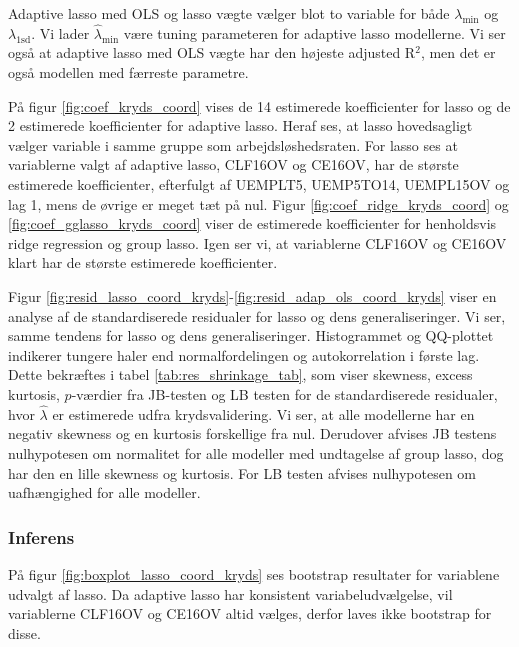 Adaptive lasso med OLS og lasso vægte vælger blot to variable for både  $\lambda_{\min}$ og $\lambda_{1\text{sd}}$. 
Vi lader $\widehat{\lambda}_{\min}$ være tuning parameteren for adaptive lasso modellerne. Vi ser også at adaptive lasso med OLS vægte har den højeste adjusted R$^2$, men det er også modellen med færreste parametre. 

På figur \ref{fig:coef_kryds_coord} vises de 14 estimerede koefficienter for lasso og de 2 estimerede koefficienter for adaptive lasso.
Heraf ses, at lasso hovedsagligt vælger variable i samme gruppe som arbejdsløshedsraten.
For lasso ses at variablerne valgt af adaptive lasso, \textcolor{blue3}{CLF16OV} og \textcolor{blue3}{CE16OV}, har de største estimerede koefficienter, efterfulgt af \textcolor{blue3}{UEMPLT5}, \textcolor{blue3}{UEMP5TO14}, \textcolor{blue3}{UEMPL15OV} og \textcolor{blue3}{lag 1}, mens de øvrige er meget tæt på nul. 
Figur \ref{fig:coef_ridge_kryds_coord} og \ref{fig:coef_gglasso_kryds_coord} viser de estimerede koefficienter for henholdsvis ridge regression og group lasso.
Igen ser vi, at variablerne \textcolor{blue3}{CLF16OV} og \textcolor{blue3}{CE16OV} klart har de største estimerede koefficienter.    
%


Figur \ref{fig:resid_lasso_coord_kryds}-\ref{fig:resid_adap_ols_coord_kryds} viser en analyse af de standardiserede residualer for lasso og dens generaliseringer. 
Vi ser, samme tendens for lasso og dens generaliseringer. Histogrammet og QQ-plottet indikerer tungere haler end normalfordelingen og autokorrelation i første lag.
Dette bekræftes i tabel \ref{tab:res_shrinkage_tab}, som viser skewness, excess kurtosis, $p$-værdier fra JB-testen og LB testen for de standardiserede residualer, hvor $\widehat{\lambda}$ er estimerede udfra krydsvalidering.  
Vi ser, at alle modellerne har en negativ skewness og en kurtosis forskellige fra nul. 
Derudover afvises JB testens nulhypotesen om normalitet for alle modeller med undtagelse af group lasso, dog har den en lille skewness og kurtosis.
For LB testen afvises nulhypotesen om uafhængighed for alle modeller.

\subsubsection{Inferens}
På figur \ref{fig:boxplot_lasso_coord_kryds} ses bootstrap resultater for variablene udvalgt af lasso.
Da adaptive lasso har konsistent variabeludvælgelse, vil variablerne \textcolor{blue3}{CLF16OV} og \textcolor{blue3}{CE16OV} altid vælges, derfor laves ikke bootstrap for disse.

